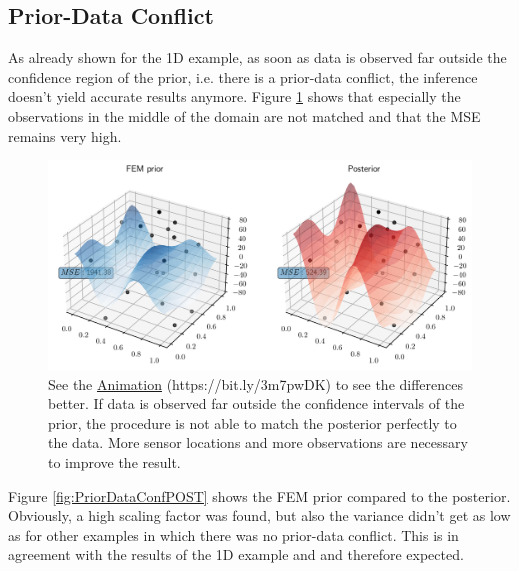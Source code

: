 \documentclass[%
  a4paper,oneside,%
  11pt,%
  smallchapters,
  style=printdev,
  extramargin,
  green,%
  rgb, <cmyk>
  ]{tubsbook}
\begin{document}
\subsection{Prior-Data Conflict}
As already shown for the 1D example, as soon as data is observed far outside the confidence region of the prior, i.e. there is a prior-data conflict, the inference doesn't yield accurate results anymore. Figure \ref{fig:3dPriorDataConf} shows that especially the observations in the middle of the domain are not matched and that the MSE remains very high.
%
\begin{figure}[!ht]
\includegraphics[width=1\textwidth]{../../Python/Results/2D/prior_data_conflict/3dMSE.pdf}
\centering
\caption[Comparison of prior and posterior in a 3D view for the observations with a prior-data conflict]{See the \href{https://github.com/herluc/Masterarbeit/blob/master/MA_LucasHermann/Python/Results/2D/prior_data_conflict/3DMSE_conflict.gif}{Animation} (https://bit.ly/3m7pwDK) to see the differences better. If data is observed far outside the confidence intervals of the prior, the procedure is not able to match the posterior perfectly to the data. More sensor locations and more observations are necessary to improve the result.}
\label{fig:3dPriorDataConf}
\end{figure}
%
Figure \ref{fig:PriorDataConfPOST} shows the FEM prior compared to the posterior. Obviously, a high scaling factor was found, but also the variance didn't get as low as for other examples in which there was no prior-data conflict. This is in agreement with the results of the 1D example and \cite{Evans2006} and therefore expected.
%
\end{document}
